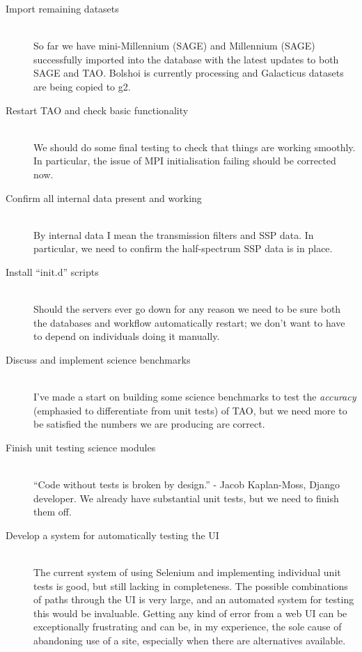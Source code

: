 \documentclass[12pt]{scrartcl}
\begin{document}
\begin{description}
  \item[Import remaining datasets] \hfill \\
    So far we have mini-Millennium (SAGE) and Millennium (SAGE)
    successfully imported into the database with the latest updates to
    both SAGE and TAO. Bolshoi is currently processing and Galacticus
    datasets are being copied to g2.
  \item[Restart TAO and check basic functionality] \hfill \\
    We should do some final testing to check that things are working
    smoothly. In particular, the issue of MPI initialisation failing
    should be corrected now.
  \item[Confirm all internal data present and working] \hfill \\
    By internal data I mean the transmission filters and SSP data. In
    particular, we need to confirm the half-spectrum SSP data is in
    place.
  \item[Install ``init.d'' scripts] \hfill \\
    Should the servers ever go down for any reason we need to be sure
    both the databases and workflow automatically restart; we don't
    want to have to depend on individuals doing it manually.
  \item[Discuss and implement science benchmarks] \hfill \\
    I've made a start on building some science benchmarks to test the
    \emph{accuracy} (emphasied to differentiate from unit tests) of
    TAO, but we need more to be satisfied the numbers we are producing
    are correct.
  \item[Finish unit testing science modules] \hfill \\
    ``Code without tests is broken by design.'' - Jacob Kaplan-Moss,
    Django developer. We already have substantial unit tests, but we
    need to finish them off.
  \item[Develop a system for automatically testing the UI] \hfill \\
    The current system of using Selenium and implementing individual
    unit tests is good, but still lacking in completeness. The
    possible combinations of paths through the UI is very large, and
    an automated system for testing this would be invaluable. Getting
    any kind of error from a web UI can be exceptionally frustrating
    and can be, in my experience, the sole cause of abandoning use of
    a site, especially when there are alternatives available.

\end{description}
\end{document}
